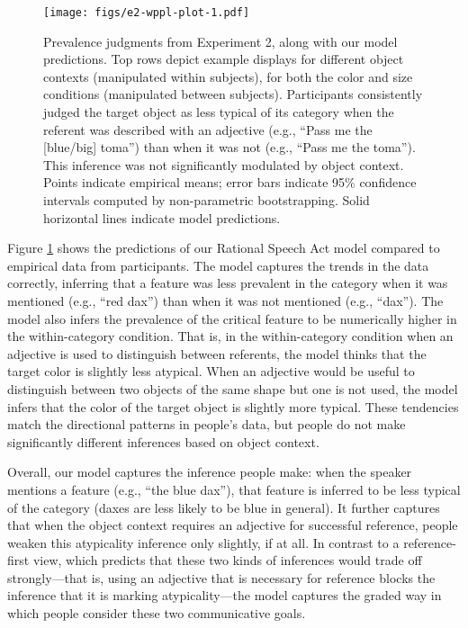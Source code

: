 \documentclass[
  english,
  man,floatsintext]{apa6}
\begin{document}
\begin{figure}
\centering
\texttt{[image: figs/e2-wppl-plot-1.pdf]}
\caption{\label{fig:e2-wppl-plot}Prevalence judgments from Experiment 2, along with our model predictions. Top rows depict example displays for different object contexts (manipulated within subjects), for both the color and size conditions (manipulated between subjects). Participants consistently judged the target object as less typical of its category when the referent was described with an adjective (e.g., ``Pass me the {[}blue/big{]} toma'') than when it was not (e.g., ``Pass me the toma''). This inference was not significantly modulated by object context. Points indicate empirical means; error bars indicate 95\% confidence intervals computed by non-parametric bootstrapping. Solid horizontal lines indicate model predictions.}
\end{figure}

Figure \ref{fig:e2-wppl-plot} shows the predictions of our Rational Speech Act model compared to empirical data from participants. The model captures the trends in the data correctly, inferring that a feature was less prevalent in the category when it was mentioned (e.g., ``red dax'') than when it was not mentioned (e.g., ``dax''). The model also infers the prevalence of the critical feature to be numerically higher in the within-category condition. That is, in the within-category condition when an adjective is used to distinguish between referents, the model thinks that the target color is slightly less atypical. When an adjective would be useful to distinguish between two objects of the same shape but one is not used, the model infers that the color of the target object is slightly more typical. These tendencies match the directional patterns in people's data, but people do not make significantly different inferences based on object context.

Overall, our model captures the inference people make: when the speaker mentions a feature (e.g., ``the blue dax''), that feature is inferred to be less typical of the category (daxes are less likely to be blue in general). It further captures that when the object context requires an adjective for successful reference, people weaken this atypicality inference only slightly, if at all. In contrast to a reference-first view, which predicts that these two kinds of inferences would trade off strongly---that is, using an adjective that is necessary for reference blocks the inference that it is marking atypicality---the model captures the graded way in which people consider these two communicative goals.
\end{document}
